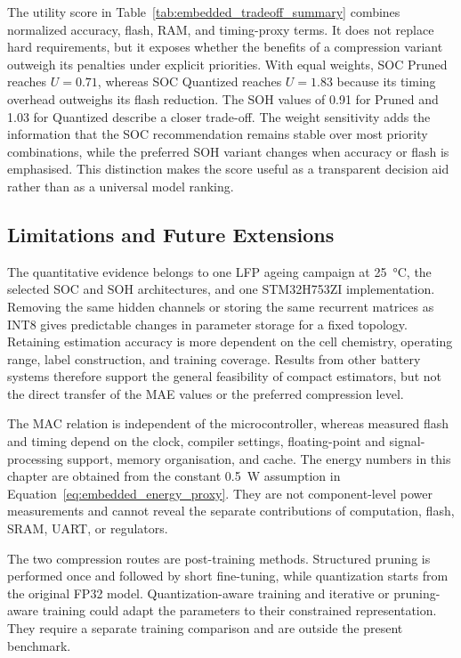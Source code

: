\documentclass[
    a4paper,
    12pt,
    titlepage,
    bibliography=totoc,
    twoside=on,
    parskip=false,
    numbers=noenddot,
    cleardoublepage=empty,
    DIV=12,
    BCOR=12.0mm,
    headheight=36pt,
    headings=openright
]{scrreprt}
\begin{document}
The utility score in Table~\ref{tab:embedded_tradeoff_summary} combines normalized accuracy, flash, RAM, and timing-proxy terms. It does not replace hard requirements, but it exposes whether the benefits of a compression variant outweigh its penalties under explicit priorities. With equal weights, SOC Pruned reaches $U=0.71$, whereas SOC Quantized reaches $U=1.83$ because its timing overhead outweighs its flash reduction. The SOH values of 0.91 for Pruned and 1.03 for Quantized describe a closer trade-off. The weight sensitivity adds the information that the SOC recommendation remains stable over most priority combinations, while the preferred SOH variant changes when accuracy or flash is emphasised. This distinction makes the score useful as a transparent decision aid rather than as a universal model ranking.

\subsection{Limitations and Future Extensions}
The quantitative evidence belongs to one LFP ageing campaign at \SI{25}{\degreeCelsius}, the selected SOC and SOH architectures, and one STM32H753ZI implementation. Removing the same hidden channels or storing the same recurrent matrices as INT8 gives predictable changes in parameter storage for a fixed topology. Retaining estimation accuracy is more dependent on the cell chemistry, operating range, label construction, and training coverage. Results from other battery systems therefore support the general feasibility of compact estimators, but not the direct transfer of the MAE values or the preferred compression level.\autocite{giazitzisCaseStudyTiny2024,liOnlineCapacityEstimation2021,rzepkaNeuralNetworkArchitecture2023a}

The MAC relation is independent of the microcontroller, whereas measured flash and timing depend on the clock, compiler settings, floating-point and signal-processing support, memory organisation, and cache. The energy numbers in this chapter are obtained from the constant \SI{0.5}{\watt} assumption in Equation~\ref{eq:embedded_energy_proxy}. They are not component-level power measurements and cannot reveal the separate contributions of computation, flash, SRAM, UART, or regulators.

The two compression routes are post-training methods. Structured pruning is performed once and followed by short fine-tuning, while quantization starts from the original FP32 model. Quantization-aware training and iterative or pruning-aware training could adapt the parameters to their constrained representation.\autocite{krishnamoorthiQuantizingDeepConvolutional2018,wenLearningIntrinsicSparse2017} They require a separate training comparison and are outside the present benchmark.
\end{document}
